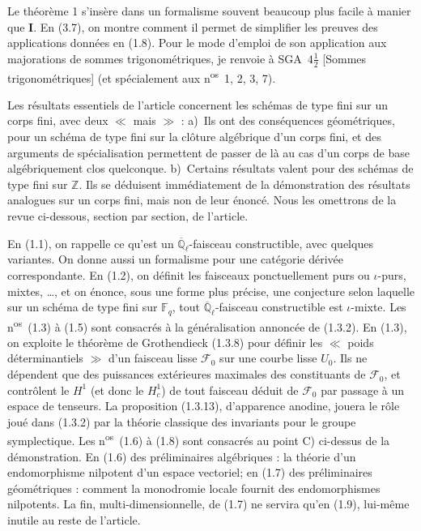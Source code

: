 \documentclass[12pt,a4paper]{article}
\theoremstyle{plain}
\theoremstyle{definition}
\theoremstyle{definition}
\theoremstyle{remark}
\begin{document}
Le th\'eor\`eme 1 s'ins\`ere dans un formalisme souvent beaucoup plus facile \`a manier que \textbf{I}. En (3.7), on montre comment il permet de simplifier les preuves des applications donn\'ees en (1.8). Pour le mode d'emploi de son application aux majorations de sommes trigonom\'etriques, je renvoie \`a SGA~$4\frac{1}{2}$ [Sommes trigonom\'etriques] (et sp\'ecialement aux n\textsuperscript{os}~1, 2, 3, 7).

Les r\'esultats essentiels de l'article concernent les sch\'emas de type fini sur un corps fini, avec deux $\ll$ mais $\gg$ : a)~Ils ont des cons\'equences g\'eom\'etriques, pour un sch\'ema de type fini sur la cl\^oture alg\'ebrique d'un corps fini, et des arguments de sp\'ecialisation permettent de passer de l\`a au cas d'un corps de base alg\'ebriquement clos quelconque. b)~Certains r\'esultats valent pour des sch\'emas de type fini sur $\mathbb{Z}$. Ils se d\'eduisent imm\'ediatement de la d\'emonstration des r\'esultats analogues sur un corps fini, mais non de leur \'enonc\'e. Nous les omettrons de la revue ci-dessous, section par section, de l'article.

En (1.1), on rappelle ce qu'est un $\overline{\mathbb{Q}}_\ell$-faisceau constructible, avec quelques variantes. On donne aussi un formalisme pour une cat\'egorie d\'eriv\'ee correspondante. En (1.2), on d\'efinit les faisceaux ponctuellement purs ou $\iota$-purs, mixtes, \ldots, et on \'enonce, sous une forme plus pr\'ecise, une conjecture selon laquelle sur un sch\'ema de type fini sur $\mathbb{F}_q$, tout $\overline{\mathbb{Q}}_\ell$-faisceau constructible est $\iota$-mixte. Les n\textsuperscript{os}~(1.3) \`a (1.5) sont consacr\'es \`a la g\'en\'eralisation annonc\'ee de (1.3.2). En (1.3), on exploite le th\'eor\`eme de Grothendieck (1.3.8) pour d\'efinir les $\ll$ poids d\'eterminantiels $\gg$ d'un faisceau lisse $\mathscr{F}_0$ sur une courbe lisse $U_0$. Ils ne d\'ependent que des puissances ext\'erieures maximales des constituants de $\mathscr{F}_0$, et contr\^olent le $H^1$ (et donc le $H_c^1$) de tout faisceau d\'eduit de $\mathscr{F}_0$ par passage \`a un espace de tenseurs. La proposition (1.3.13), d'apparence anodine, jouera le r\^ole jou\'e dans (1.3.2) par la th\'eorie classique des invariants pour le groupe symplectique. Les n\textsuperscript{os}~(1.6) \`a (1.8) sont consacr\'es au point C) ci-dessus de la d\'emonstration. En (1.6) des pr\'eliminaires alg\'ebriques : la th\'eorie d'un endomorphisme nilpotent d'un espace vectoriel; en (1.7) des pr\'eliminaires g\'eom\'etriques : comment la monodromie locale fournit des endomorphismes nilpotents. La fin, multi-dimensionnelle, de (1.7) ne servira qu'en (1.9), lui-m\^eme inutile au reste de l'article.
\end{document}
